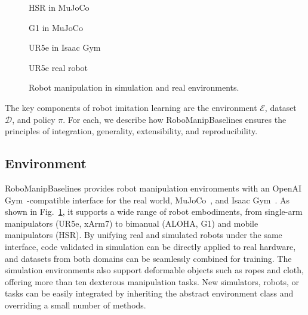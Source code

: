 \documentclass[letterpaper, 10 pt, conference]{ieeeconf}  %
\newcommand{\figref}[1]{{Fig.~\ref{#1}}}
\begin{document}
\begin{figure}[tb]
  \begin{minipage}{0.16\textwidth}
    \begin{center} \footnotesize HSR in MuJoCo \end{center}
  \end{minipage}
  \begin{minipage}{0.16\textwidth}
    \begin{center} \footnotesize G1 in MuJoCo \end{center}
  \end{minipage}
  \begin{minipage}[t]{0.16\textwidth}
    \begin{center} \footnotesize UR5e in Isaac Gym \end{center}
  \end{minipage}
  \begin{minipage}{0.16\textwidth}
    \begin{center} \footnotesize UR5e real robot \end{center}
  \end{minipage}
  \vspace{-1mm}
  \caption{Robot manipulation in simulation and real environments.}
  \label{fig:env}
  \vspace{-3mm}
\end{figure}

The key components of robot imitation learning are the environment $\mathcal{E}$, dataset $\mathcal{D}$, and policy $\pi$.
For each, we describe how RoboManipBaselines ensures the principles of integration, generality, extensibility, and reproducibility.

\subsection{Environment}

RoboManipBaselines provides robot manipulation environments with an OpenAI Gym~\cite{OpenAIGym:Brockman:arXiv2016}-compatible interface for the real world, MuJoCo~\cite{MuJoCo:Todorov:IROS2012}, and Isaac Gym~\cite{IsaacGym:Makoviychuk:NeurIPS2021}.
As shown in \figref{fig:env}, it supports a wide range of robot embodiments, from single-arm manipulators (UR5e, xArm7) to bimanual (ALOHA, G1) and mobile manipulators (HSR).
By unifying real and simulated robots under the same interface, code validated in simulation can be directly applied to real hardware, and datasets from both domains can be seamlessly combined for training.
The simulation environments also support deformable objects such as ropes and cloth, offering more than ten dexterous manipulation tasks.
New simulators, robots, or tasks can be easily integrated by inheriting the abstract environment class and overriding a small number of methods.
\end{document}
